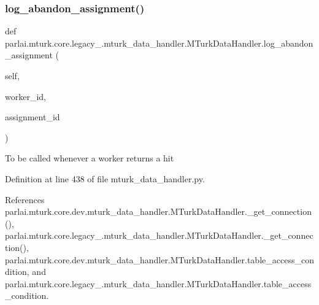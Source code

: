 \subsubsection{\texorpdfstring{log\+\_\+abandon\+\_\+assignment()}{log\_abandon\_assignment()}}
{\footnotesize\ttfamily def parlai.\+mturk.\+core.\+legacy\+\_.\+mturk\+\_\+data\+\_\+handler.\+M\+Turk\+Data\+Handler.\+log\+\_\+abandon\+\_\+assignment (\begin{DoxyParamCaption}\item[{}]{self,  }\item[{}]{worker\+\_\+id,  }\item[{}]{assignment\+\_\+id }\end{DoxyParamCaption})}

\begin{DoxyVerb}To be called whenever a worker returns a hit\end{DoxyVerb}
 

Definition at line 438 of file mturk\+\_\+data\+\_\+handler.\+py.



References parlai.\+mturk.\+core.\+dev.\+mturk\+\_\+data\+\_\+handler.\+M\+Turk\+Data\+Handler.\+\_\+get\+\_\+connection(), parlai.\+mturk.\+core.\+legacy\+\_.\+mturk\+\_\+data\+\_\+handler.\+M\+Turk\+Data\+Handler.\+\_\+get\+\_\+connection(), parlai.\+mturk.\+core.\+dev.\+mturk\+\_\+data\+\_\+handler.\+M\+Turk\+Data\+Handler.\+table\+\_\+access\+\_\+condition, and parlai.\+mturk.\+core.\+legacy\+\_.\+mturk\+\_\+data\+\_\+handler.\+M\+Turk\+Data\+Handler.\+table\+\_\+access\+\_\+condition.

